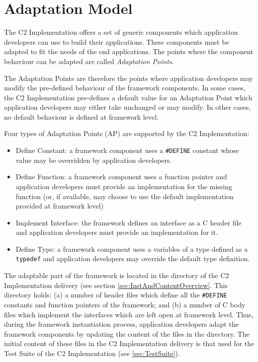 \documentclass{pnp_article}
\begin{document}
\section{Adaptation Model}\label{sec:AdaptationModel}
The C2 Implementation offers a set of generic components which application developers can use to build their applications. These components must be adapted to fit the needs of the end applications. The points where the component behaviour can be adapted are called \textit{Adaptation Points}.

The Adaptation Points are therefore the points where application developers may modify the pre-defined behaviour of the framework components. In some cases, the C2 Implementation pre-defines a default value for an Adaptation Point which application developers may either take unchanged or may modify. In other cases, no default behaviour is defined at framework level. 

Four types of Adaptation Points (AP) are supported by the C2 Implementation:

\begin{itemize}
\item Define Constant: a framework component uses a \texttt{\#DEFINE} constant whose value may be overridden by application developers.
\item Define Function: a framework component uses a function pointer and application developers must provide an implementation for the missing function (or, if available, may choose to use the default implementation provided at framework level)
\item Implement Interface: the framework defines an interface as a C header file and application developers must provide an implementation for it.
\item Define Type: a framework component uses a variables of a type defined as a \texttt{typedef} and application developers may override the default type definition.
\end{itemize}

The adaptable part of the framework is located in the  directory of the C2 Implementation delivery (see section \ref{sec:InstAndContentOverview}. This directory holds: (a) a number of header files which define all the \texttt{\#DEFINE} constants and function pointers of the framework; and (b) a number of C body files which implement the interfaces which are left open at framework level. Thus, during the framework instantiation process, application developers adapt the framework components by updating the content of the files in the  directory. The initial content of these files in the C2 Implementation delivery is that used for the Test Suite of the C2 Implementation (see \ref{sec:TestSuite}). 
\end{document}
